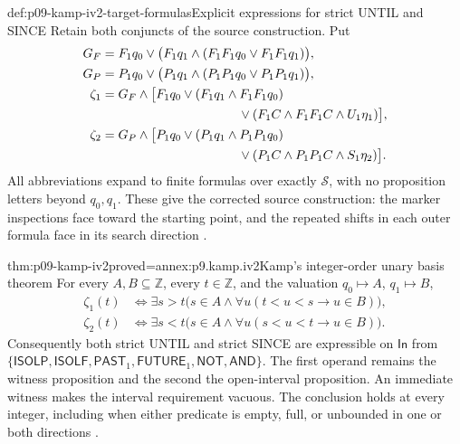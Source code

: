 \begin{hbdefinition}{def:p09-kamp-iv2-target-formulas}{Explicit expressions for strict UNTIL and SINCE}
Retain both conjuncts of the source construction. Put
\[
\begin{aligned}
 G_F&=F_1q_0\lor
       \bigl(F_1q_1\land(F_1F_1q_0\lor F_1F_1q_1)\bigr),\\
 G_P&=P_1q_0\lor
       \bigl(P_1q_1\land(P_1P_1q_0\lor P_1P_1q_1)\bigr),\\
 \zeta_1&=G_F\land\bigl[
       F_1q_0\lor(F_1q_1\land F_1F_1q_0)\\
       &\hspace{38mm}\lor
          (F_1C\land F_1F_1C\land U_1\eta_1)\bigr],\\
 \zeta_2&=G_P\land\bigl[
       P_1q_0\lor(P_1q_1\land P_1P_1q_0)\\
       &\hspace{38mm}\lor
          (P_1C\land P_1P_1C\land S_1\eta_2)\bigr].
\end{aligned}
\]
All abbreviations expand to finite formulas over exactly
\(\mathcal S\), with no proposition letters beyond \(q_0,q_1\).
These give the corrected source construction: the marker inspections
face toward the starting point, and the repeated shifts in each
outer formula face in its search direction
\cite[ch.~IV, thm.~2, pp.~100--105]{Kamp1968}.
\end{hbdefinition}

\begin{hbtheorem}{thm:p09-kamp-iv2}{proved=annex:p9.kamp.iv2}{Kamp's integer-order unary basis theorem}
For every \(A,B\subseteq\mathbb Z\), every
\(t\in\mathbb Z\), and the valuation \(q_0\mapsto A\),
\(q_1\mapsto B\),
\[
\begin{aligned}
 \zeta_1(t)&\Longleftrightarrow
       \exists s>t\bigl(s\in A\land
                       \forall u(t<u<s\to u\in B)\bigr),\\
 \zeta_2(t)&\Longleftrightarrow
       \exists s<t\bigl(s\in A\land
                       \forall u(s<u<t\to u\in B)\bigr).
\end{aligned}
\]
Consequently both strict UNTIL and strict SINCE are expressible
on \(\mathsf{In}\) from
\(\{\mathsf{ISOLP},\mathsf{ISOLF},\mathsf{PAST}_1,
\mathsf{FUTURE}_1,\mathsf{NOT},\mathsf{AND}\}\).
The first operand remains the witness proposition and the second
the open-interval proposition. An immediate witness makes the
interval requirement vacuous. The conclusion holds at every integer,
including when either predicate is empty, full, or unbounded in
one or both directions
\cite[ch.~IV, thm.~2, pp.~100--105]{Kamp1968}.
\end{hbtheorem}

